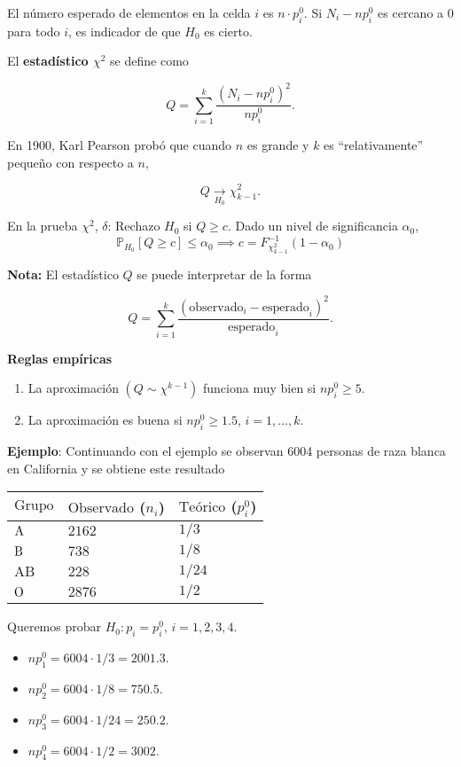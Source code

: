 \documentclass[
  12pt,
]{book}
\begin{document}
El número esperado de elementos en la celda \(i\) es \(n\cdot p_i^0\). Si \(N_i -np_i^0\) es cercano a 0 para todo \(i\), es indicador de que \(H_0\) es cierto.

El \textbf{estadístico \(\chi^2\)} se define como

\[Q = \sum_{i=1}^k\dfrac{(N_i-np_i^0)^2}{np_i^0}.\]

En 1900, Karl Pearson probó que cuando \(n\) es grande y \(k\) es ``relativamente''
pequeño con respecto a \(n\),

\[Q \xrightarrow[H_0]{}\chi^2_{k-1}.\]

En la prueba \(\chi^2\), \(\delta\): Rechazo \(H_0\) si \(Q\geq c\). Dado un nivel de significancia \(\alpha_0\),
\[\mathbb P_{H_0}[Q\geq c]\le \alpha_0\implies c = F^{-1}_{\chi^2_{k-1}}(1-\alpha_0)\]

\textbf{Nota:} El estadístico \(Q\) se puede interpretar de la forma

\[Q = \sum_{i=1}^k\dfrac{(\text{observado}_{i} - \text{esperado}_{i})^2}{\text{esperado}_{i}}.\]

\textbf{Reglas empíricas}

\begin{enumerate}
\def\labelenumi{\arabic{enumi}.}
\item
  La aproximación \((Q\sim\chi^{k-1})\) funciona muy bien si \(np_i^0\geq 5\).
\item
  La aproximación es buena si \(np_i^0\ge 1.5\), \(i=1,\dots,k\).
\end{enumerate}

\textbf{Ejemplo}: Continuando con el ejemplo se observan 6004 personas de raza blanca en California y se obtiene este resultado

\begin{longtable}[]{@{}lll@{}}
\toprule
\(\text{Grupo}\) & \(\text{Observado}\) (\(n_i\)) & \(\text{Teórico}\) (\(p_i ^{0}\))\tabularnewline
\midrule
\endhead
\(\text A\) & \(2162\) & \(1/3\)\tabularnewline
\(\text B\) & \(738\) & \(1/8\)\tabularnewline
\(\text {AB}\) & \(228\) & \(1/24\)\tabularnewline
\(\text O\) & \(2876\) & \(1/2\)\tabularnewline
\bottomrule
\end{longtable}

Queremos probar \(H_0: p_i = p_i^0\), \(i=1,2,3,4\).

\begin{itemize}
\item
  \(np_1^0 = 6004\cdot1/3 = 2001.3\).
\item
  \(np_2^0 = 6004\cdot1/8 = 750.5\).
\item
  \(np_3^0 = 6004\cdot1/24 = 250.2\).
\item
  \(np_4^0 = 6004\cdot1/2 = 3002\).
\end{itemize}
\end{document}
